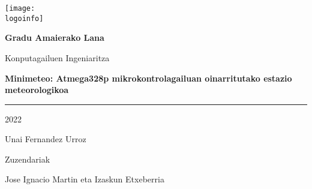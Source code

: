 \documentclass[11pt, twoside, a4paper, openright]{book}
\newcommand{\logoinfo}{images/FacultadInformatica-Gipuzkoa-bilingue-positivo-alta.jpg}
\newcommand{\doctitle}{Minimeteo: Atmega328p mikrokontrolagailuan oinarritutako estazio meteorologikoa}
\newcommand{\subjectname}{Gradu Amaierako Lana}
\newcommand{\authornames}{Unai Fernandez Urroz}
\begin{document}
\frontmatter
    \begin{titlepage}
    \centering
    \texttt{[image: \\logoinfo]}\par\vspace{1cm}
    {\Large \textbf{\subjectname}}\par\vspace{0.2cm} Konputagailuen Ingeniaritza \par\vspace{4cm}
    \Huge\bfseries\textcolor{frostblue}{\doctitle}
    \textcolor{frostblue}{\noindent\rule{\textwidth}{0.4pt}\vspace{1cm}}
    \normalsize 2022 \par \vspace{0.5cm}
    \Large \authornames \par \vspace{2cm}
    \normalsize Zuzendariak \par \vspace{0.5cm}
    \normalsize Jose Ignacio Martin eta Izaskun Etxeberria
    \end{titlepage}
    
     
    \clearpage
    \pagestyle{plain}
    \tableofcontents
    \listoffigures
    \listoftables
    \pagestyle{fancy}
   \mainmatter
    \newpage
    
    
    
    
    
    
      
    
\end{document}
